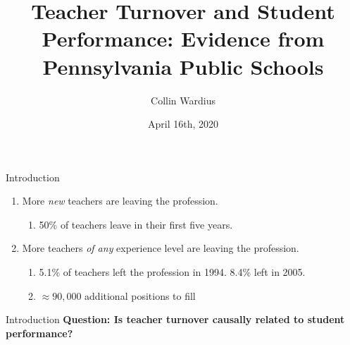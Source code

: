 \documentclass[notes]{beamer}
\title{Teacher Turnover and Student Performance: Evidence from Pennsylvania Public Schools}
\author{Collin Wardius}
\institute{Temple University}
\date{April 16th, 2020}
\begin{document}
\begin{frame}
\titlepage
\end{frame}

\begin{frame}{Introduction}
\doublespacing
\begin{enumerate}[I]
    \item More \textit{new} teachers are leaving the profession. \cite{watlington}
    \begin{enumerate}[i]
        \item 50\% of teachers leave in their first five years.
    \end{enumerate}
 \item More teachers \textit{of any} experience level are leaving the profession. \cite{hammond}
 \begin{enumerate}[i]
    \item 5.1\% of teachers left the profession in 1994. 8.4\% left in 2005.
    \item $\approx 90,000$ additional positions to fill 
\end{enumerate}
\end{enumerate}
\end{frame}


\begin{frame}{Introduction}
\doublespacing
\textbf{Question: Is teacher turnover causally related to student performance?}
\end{frame}
\end{document}
